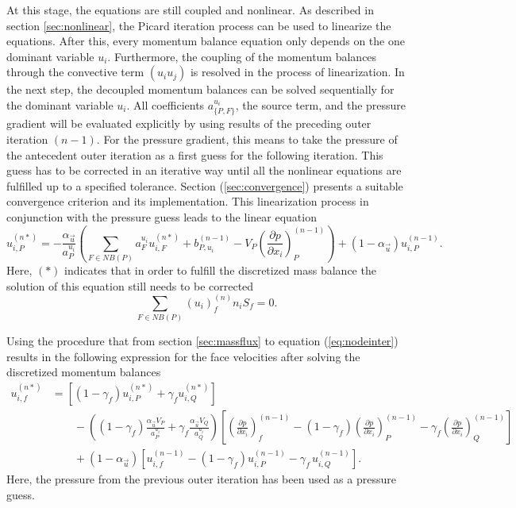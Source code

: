 At this stage, the equations are still coupled and nonlinear. As described in section \ref{sec:nonlinear}, the Picard iteration process can be used to linearize the equations. After this, every momentum balance equation only depends on the one dominant variable \(u_i\). Furthermore, the coupling of the momentum balances through the convective term \((u_i u_j)\) is resolved in the process of linearization. In the next step, the decoupled momentum balances can be solved sequentially for the dominant variable \(u_i\). All coefficients \(a_{\{P,F\}}^{u_i}\), the source term, and the pressure gradient will be evaluated explicitly by using results of the preceding outer iteration \((n-1)\). For the pressure gradient, this means to take the pressure of the antecedent outer iteration as a first guess for the following iteration. This guess has to be corrected in an iterative way until all the nonlinear equations are fulfilled up to a specified tolerance. Section (\ref{sec:convergence}) presents a suitable convergence criterion and its implementation. This linearization process in conjunction with the pressure guess leads to the linear equation 
\begin{equation}
  \label{eq:nodeinter}
  u_{i,P}^{(n*)} 
  = 
  - \frac{\alpha_{\vec{u}}}{a_P^{u_i}} \left(\sum_{F \in NB(P)} a_F^{u_i} u_{i,F}^{(n*)}
  +                                     b_{P,u_i}^{(n-1)} 
  -                                     V_P\left(\frac{\partial p}{\partial x_i}\right)_P^{(n-1)} \right)
  + \left(1 - \alpha_{\vec{u}}\right) u_{i,P}^{(n-1)}.
\end{equation}
Here, \((*)\) indicates that in order to fulfill the discretized mass balance the solution of this equation still needs to be corrected 
\begin{equation}
  \label{eq:contisemi}
  \sum_{F \in NB(P)} (u_i)_f^{(n)} n_i S_f = 0.
\end{equation}

Using the procedure that from section \ref{sec:massflux} to equation (\ref{eq:nodeinter}) results in the following expression for the face velocities after solving the discretized momentum balances 
\begin{align}
  \label{eq:faceinter}
  u_{i,f}^{(n*)} 
  &=
  \left[\left(1 - \gamma_f\right) u_{i,P}^{(n*)} + \gamma_f u_{i,Q}^{(n*)} \right] \nonumber \\[1em]
  &\quad\quad - 
  \left(\left(1 - \gamma_f\right) \frac{\alpha_\vec{u} V_P}{a_P^{u_i}} + \gamma_f \frac{\alpha_\vec{u} V_Q}{a_Q^{u_i}}\right)
  \left[ 
  \left(\frac{\partial p}{\partial x_i}\right)_f^{(n-1)} 
  - \left( 1 - \gamma_f \right) \left( \frac{\partial p}{\partial x_i} \right)_P^{(n-1)} 
  - \gamma_f \left(\frac{\partial p}{\partial x_i}\right)_Q^{(n-1)}
  \right] \nonumber \\[1em]
  &\quad\quad + \left(1 - \alpha_\vec{u}\right) \left[ u_{i,f}^{(n-1)} - \left(1 - \gamma_f\right) u_{i,P}^{(n-1)} - \gamma_f \, u_{i,Q}^{(n-1)} \right].
\end{align}
Here, the pressure from the previous outer iteration has been used as a pressure guess.

